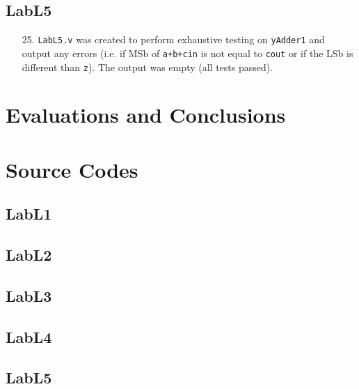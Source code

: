 \documentclass{article}
\begin{document}
\subsection{LabL5}
\begin{enumerate}
\item[25. ] \verb$LabL5.v$ was created to perform exhaustive testing on \verb$yAdder1$ and output any errors (i.e. if MSb of \verb$a+b+cin$ is not equal to \verb$cout$ or if the LSb is different than \verb$z$). The output was empty (all tests passed).
\end{enumerate}


\section{Evaluations and Conclusions}



\section{Source Codes}


\subsection{LabL1}



\subsection{LabL2}



\subsection{LabL3}



\subsection{LabL4}



\subsection{LabL5}



\end{document}
